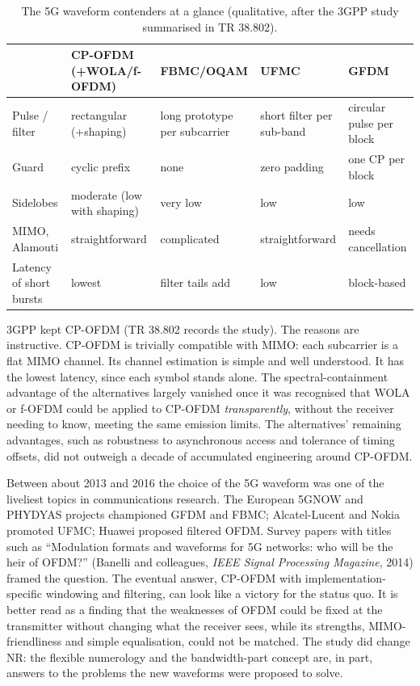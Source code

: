 \begin{table}[H]\centering\footnotesize
\caption{The 5G waveform contenders at a glance (qualitative, after the 3GPP study summarised in TR 38.802).}
\label{tab:ch17:waveforms}
\begin{tabular}{@{}p{2.3cm}p{2.6cm}p{2.5cm}p{2.3cm}p{2.3cm}@{}}
\toprule
 & CP-OFDM (+WOLA/f-OFDM) & FBMC/OQAM & UFMC & GFDM \\
\midrule
Pulse / filter & rectangular (+shaping) & long prototype per subcarrier & short filter per sub-band & circular pulse per block \\
Guard & cyclic prefix & none & zero padding & one CP per block \\
Sidelobes & moderate (low with shaping) & very low & low & low \\
MIMO, Alamouti & straightforward & complicated & straightforward & needs cancellation \\
Latency of short bursts & lowest & filter tails add & low & block-based \\
\bottomrule
\end{tabular}
\end{table}

3GPP kept CP-OFDM (TR 38.802 records the study). The reasons are instructive. CP-OFDM is trivially compatible with
MIMO: each subcarrier is a flat MIMO channel. Its channel estimation is simple and well understood. It has the
lowest latency, since each symbol stands alone. The spectral-containment advantage of the alternatives largely
vanished once it was recognised that WOLA or f-OFDM could be applied to CP-OFDM \emph{transparently}, without
the receiver needing to know, meeting the same emission limits. The alternatives' remaining advantages, such as
robustness to asynchronous access and tolerance of timing offsets, did not outweigh a decade of accumulated
engineering around CP-OFDM.

\begin{history}
Between about 2013 and 2016 the choice of the 5G waveform was one of the liveliest topics in communications
research. The European 5GNOW and PHYDYAS projects championed GFDM and FBMC; Alcatel-Lucent and Nokia promoted UFMC;
Huawei proposed filtered OFDM. Survey papers with titles such as ``Modulation formats and waveforms for 5G
networks: who will be the heir of OFDM?'' (Banelli and colleagues, \emph{IEEE Signal Processing Magazine}, 2014)
framed the question. The eventual answer, CP-OFDM with implementation-specific windowing and filtering, can look
like a victory for the status quo. It is better read as a finding that the weaknesses of OFDM could be fixed at the
transmitter without changing what the receiver sees, while its strengths, MIMO-friendliness and simple
equalisation, could not be matched. The study did change NR: the flexible numerology and the bandwidth-part
concept are, in part, answers to the problems the new waveforms were proposed to solve.
\end{history}

